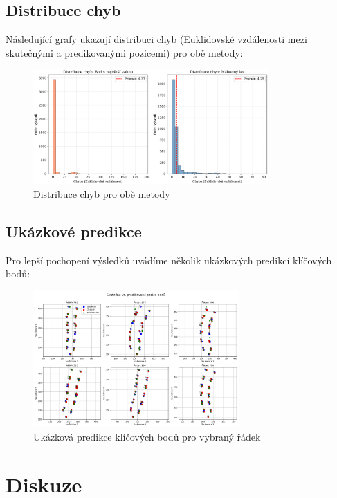 \documentclass[a4paper,12pt]{article}
\begin{document}
\subsection{Distribuce chyb}

Následující grafy ukazují distribuci chyb (Euklidovské vzdálenosti mezi skutečnými a predikovanými pozicemi) pro obě metody:

\begin{figure}[H]
    \centering
    \includegraphics[width=0.8\textwidth]{distribuce_chyb.png}
    \caption{Distribuce chyb pro obě metody}
    \label{fig:error_distribution}
\end{figure}

\subsection{Ukázkové predikce}

Pro lepší pochopení výsledků uvádíme několik ukázkových predikcí klíčových bodů:

\begin{figure}[H]
    \centering
    \includegraphics[width=0.7\textwidth]{ukazkove_predikce.png}
    \caption{Ukázková predikce klíčových bodů pro vybraný řádek}
    \label{fig:example_predictions}
\end{figure}

\section{Diskuze}
\label{sec:discussion}
\end{document}
